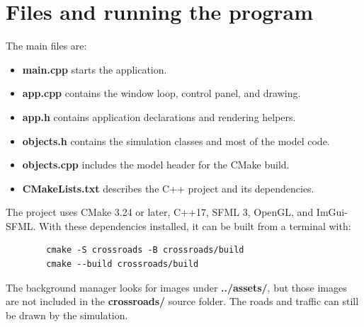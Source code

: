 \documentclass[12pt,a4paper]{article}
\begin{document}
	\section{Files and running the program}
	
	The main files are:
	\begin{itemize}
		\item \textbf{main.cpp} starts the application.
		\item \textbf{app.cpp} contains the window loop, control panel, and drawing.
		\item \textbf{app.h} contains application declarations and rendering helpers.
		\item \textbf{objects.h} contains the simulation classes and most of the model
		code.
		\item \textbf{objects.cpp} includes the model header for the CMake build.
		\item \textbf{CMakeLists.txt} describes the C++ project and its dependencies.
	\end{itemize}
	
	The project uses CMake 3.24 or later, C++17, SFML 3, OpenGL, and ImGui-SFML.
	With these dependencies installed, it can be built from a terminal with:
	
	\begin{verbatim}
		cmake -S crossroads -B crossroads/build
		cmake --build crossroads/build
	\end{verbatim}
	
	The background manager looks for images under \textbf{../assets/}, but those
	images are not included in the \textbf{crossroads/} source folder. The roads and
	traffic can still be drawn by the simulation.
	
\end{document}
